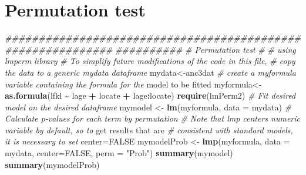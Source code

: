 \documentclass[
  12pt,
]{book}
\newenvironment{Shaded}{\begin{snugshade}}{\end{snugshade}}
\newcommand{\CharTok}[1]{\textcolor[rgb]{0.31,0.60,0.02}{#1}}
\newcommand{\CommentTok}[1]{\textcolor[rgb]{0.56,0.35,0.01}{\textit{#1}}}
\newcommand{\ControlFlowTok}[1]{\textcolor[rgb]{0.13,0.29,0.53}{\textbf{#1}}}
\newcommand{\DataTypeTok}[1]{\textcolor[rgb]{0.13,0.29,0.53}{#1}}
\newcommand{\DecValTok}[1]{\textcolor[rgb]{0.00,0.00,0.81}{#1}}
\newcommand{\KeywordTok}[1]{\textcolor[rgb]{0.13,0.29,0.53}{\textbf{#1}}}
\newcommand{\NormalTok}[1]{#1}
\newcommand{\OperatorTok}[1]{\textcolor[rgb]{0.81,0.36,0.00}{\textbf{#1}}}
\newcommand{\OtherTok}[1]{\textcolor[rgb]{0.56,0.35,0.01}{#1}}
\newcommand{\StringTok}[1]{\textcolor[rgb]{0.31,0.60,0.02}{#1}}
\begin{document}
\begin{Shaded}
\end{Shaded}

\hypertarget{permutation-test}{%
\section{Permutation test}\label{permutation-test}}

\begin{Shaded}
\begin{Highlighting}[]
\CommentTok{\#\#\#\#\#\#\#\#\#\#\#\#\#\#\#\#\#\#\#\#\#\#\#\#\#\#\#\#\#\#\#\#\#\#\#\#\#\#\#\#\#\#\#\#\#\#\#\#\#\#\#\#\#\#\#\#\#\#\#\#}
\CommentTok{\#\#\#\#\#\#\#\#\#\#}
\CommentTok{\# Permutation test}
\CommentTok{\#}
\CommentTok{\# using lmperm library}
\CommentTok{\# To simplify future modifications of the code in this file,}
\CommentTok{\# copy the data to a generic mydata dataframe}
\NormalTok{mydata\textless{}{-}anc3dat}
\CommentTok{\# create a myformula variable containing the formula for the}
\NormalTok{model to be fitted}
\NormalTok{myformula\textless{}{-}}\KeywordTok{as.formula}\NormalTok{(lfkl }\OperatorTok{\textasciitilde{}}\StringTok{ }\NormalTok{lage }\OperatorTok{+}\StringTok{ }\NormalTok{locate }\OperatorTok{+}\StringTok{ }\NormalTok{lage}\OperatorTok{:}\NormalTok{locate)}
\KeywordTok{require}\NormalTok{(lmPerm2)}
\CommentTok{\# Fit desired model on the desired dataframe}
\NormalTok{mymodel \textless{}{-}}\StringTok{ }\KeywordTok{lm}\NormalTok{(myformula, }\DataTypeTok{data =}\NormalTok{ mydata)}
\CommentTok{\# Calculate p{-}values for each term by permutation}
\CommentTok{\# Note that lmp centers numeric variable by default, so to}
\NormalTok{get results that are}
\CommentTok{\# consistent with standard models, it is necessary to set}
\NormalTok{center=}\OtherTok{FALSE}
\NormalTok{mymodelProb \textless{}{-}}\StringTok{ }\KeywordTok{lmp}\NormalTok{(myformula, }\DataTypeTok{data =}\NormalTok{ mydata, }\DataTypeTok{center=}\OtherTok{FALSE}\NormalTok{,}
\DataTypeTok{perm =} \StringTok{"Prob"}\NormalTok{)}
\KeywordTok{summary}\NormalTok{(mymodel)}
\KeywordTok{summary}\NormalTok{(mymodelProb)}
\end{Highlighting}
\end{Shaded}
\end{document}
